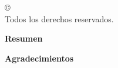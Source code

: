   \onehalfspacing


  \cleardoublepage
  \thispagestyle{empty}
  \begin{center}
    \copyright\ \nombreautor\ \anio \\
    Todos los derechos reservados.
  \end{center}



  \cleardoublepage
   
  \begin{center} \Large \textbf{Resumen} \end{center}
  \resumen


  \cleardoublepage {}
  \begin{center} \Large \textbf{Agradecimientos} \end{center}
  \agradecimientos


  \cleardoublepage \vspace*{1.5in}
  \begin{flushright} \dedicatoria \end{flushright}


  \cleardoublepage
  \tableofcontents
  \cleardoublepage
  \listoffigures
  \cleardoublepage
  \listoftables
  \cleardoublepage

  \normalsize

